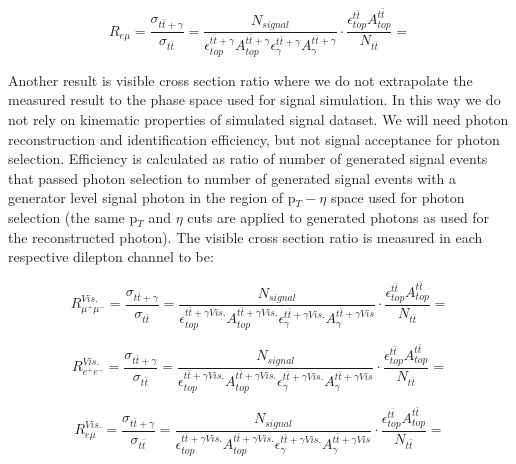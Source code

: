 \begin{equation}
	R_{e\mu} = \frac{\sigma_{t\bar{t}+\gamma}}{\sigma_{t\bar{t}}} = \frac{N_{signal}}{\epsilon^{t\bar{t}+\gamma}_{top} A^{t\bar{t}+\gamma}_{top} \epsilon^{t\bar{t}+\gamma}_{\gamma} A^{t\bar{t}+\gamma}_{\gamma}} \cdot \frac{\epsilon^{t\bar{t}}_{top} A^{t\bar{t}}_{top}}{N_{t\bar{t}}} = 
\end{equation}

Another result is visible cross section ratio where we do not extrapolate the measured result to the phase space used for signal simulation. In this way we do not rely on kinematic properties of simulated signal dataset. We will need photon reconstruction and identification efficiency, but not signal acceptance for photon selection. Efficiency is calculated as ratio of number of generated signal events that passed photon selection to number of generated signal events with a generator level signal photon in the region of p$_T - \eta$ space used for photon selection (the same p$_T$ and $\eta$ cuts are applied to generated photons as used for the reconstructed photon). The visible cross section ratio is measured in each respective dilepton channel to be:

\begin{equation}
	R^{Vis.}_{\mu^+\mu^-} = \frac{\sigma_{t\bar{t}+\gamma}}{\sigma_{t\bar{t}}} = \frac{N_{signal}}{\epsilon^{t\bar{t}+\gamma Vis.}_{top} A^{t\bar{t}+\gamma Vis.}_{top} \epsilon^{t\bar{t}+\gamma Vis.}_{\gamma} A^{t\bar{t}+\gamma Vis}_{\gamma}} \cdot \frac{\epsilon^{t\bar{t}}_{top} A^{t\bar{t}}_{top}}{N_{t\bar{t}}} = 
\end{equation}

\begin{equation}
	R^{Vis.}_{e^+e^-} = \frac{\sigma_{t\bar{t}+\gamma}}{\sigma_{t\bar{t}}} = \frac{N_{signal}}{\epsilon^{t\bar{t}+\gamma Vis.}_{top} A^{t\bar{t}+\gamma Vis.}_{top} \epsilon^{t\bar{t}+\gamma Vis.}_{\gamma} A^{t\bar{t}+\gamma Vis}_{\gamma}} \cdot \frac{\epsilon^{t\bar{t}}_{top} A^{t\bar{t}}_{top}}{N_{t\bar{t}}} = 
\end{equation}

\begin{equation}
	R^{Vis.}_{e\mu} = \frac{\sigma_{t\bar{t}+\gamma}}{\sigma_{t\bar{t}}} = \frac{N_{signal}}{\epsilon^{t\bar{t}+\gamma Vis.}_{top} A^{t\bar{t}+\gamma Vis.}_{top} \epsilon^{t\bar{t}+\gamma Vis.}_{\gamma} A^{t\bar{t}+\gamma Vis}_{\gamma}} \cdot \frac{\epsilon^{t\bar{t}}_{top} A^{t\bar{t}}_{top}}{N_{t\bar{t}}} = 
\end{equation}

